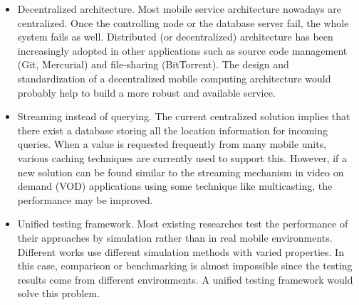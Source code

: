 \documentclass[12pt,a4paper,titlepage]{article}
\begin{document}
\begin{itemize}
	\item Decentralized architecture. Most mobile service architecture nowadays are centralized. Once the controlling node or the database server fail, the whole system fails as well. Distributed (or decentralized) architecture has been increasingly adopted in other applications such as source code management (Git, Mercurial) and file-sharing (BitTorrent). The design and standardization of a decentralized mobile computing architecture would probably help to build a more robust and available service.
	\item Streaming instead of querying. The current centralized solution implies that there exist a database storing all the location information for incoming queries. When a value is requested frequently from many mobile units, various caching techniques are currently used to support this. However, if a new solution can be found similar to the streaming mechanism in video on demand (VOD) applications using some technique like multicasting, the performance may be improved.
	\item Unified testing framework. Most existing researches test the performance of their approaches by simulation rather than in real mobile environments. Different works use different simulation methods with varied properties. In this case, comparison or benchmarking is almost impossible since the testing results come from different environments. A unified testing framework would solve this problem.
\end{itemize}




\end{document}
